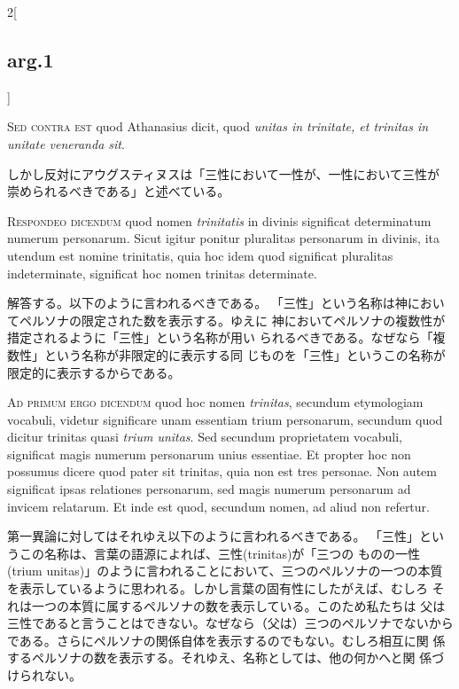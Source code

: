 \documentclass[paper=a4paper,fontsize=10pt,jafontsize=9pt,titlepage]{jlreq}
\begin{document}
\begin{paracol}{2}[\subsection{arg.1}]
\switchcolumn*[\subsection{s.c.}]

{\scshape Sed contra est} quod Athanasius dicit, quod {\itshape unitas in trinitate, et
trinitas in unitate veneranda sit}.

\switchcolumn

しかし反対にアウグスティヌスは「三性において一性が、一性において三性が
 崇められるべきである」と述べている。


{\scshape Respondeo dicendum} quod nomen {\itshape trinitatis} in divinis significat
determinatum numerum personarum. Sicut igitur ponitur pluralitas
personarum in divinis, ita utendum est nomine trinitatis, quia hoc
idem quod significat pluralitas indeterminate, significat hoc nomen
trinitas determinate.

\switchcolumn

解答する。以下のように言われるべきである。
「三性」という名称は神においてペルソナの限定された数を表示する。ゆえに
 神においてペルソナの複数性が措定されるように「三性」という名称が用い
 られるべきである。なぜなら「複数性」という名称が非限定的に表示する同
 じものを「三性」というこの名称が限定的に表示するからである。

\switchcolumn*[\subsection{ad.1}]

{\scshape Ad primum ergo dicendum} quod hoc nomen {\itshape trinitas}, secundum etymologiam
vocabuli, videtur significare unam essentiam trium personarum,
secundum quod dicitur trinitas quasi {\itshape trium unitas}. Sed secundum
proprietatem vocabuli, significat magis numerum personarum unius
essentiae. Et propter hoc non possumus dicere quod pater sit trinitas,
quia non est tres personae. Non autem significat ipsas relationes
personarum, sed magis numerum personarum ad invicem relatarum. Et inde
est quod, secundum nomen, ad aliud non refertur.

\switchcolumn

第一異論に対してはそれゆえ以下のように言われるべきである。
「三性」というこの名称は、言葉の語源によれば、三性(trinitas)が「三つの
 ものの一性(trium unitas)」のように言われることにおいて、三つのペルソナの一つの本質
 を表示しているように思われる。しかし言葉の固有性にしたがえば、むしろ
 それは一つの本質に属するペルソナの数を表示している。このため私たちは
 父は三性であると言うことはできない。なぜなら（父は）三つのペルソナでないから
 である。さらにペルソナの関係自体を表示するのでもない。むしろ相互に関
 係するペルソナの数を表示する。それゆえ、名称としては、他の何かへと関
 係づけられない。


\end{paracol}
\end{document}
